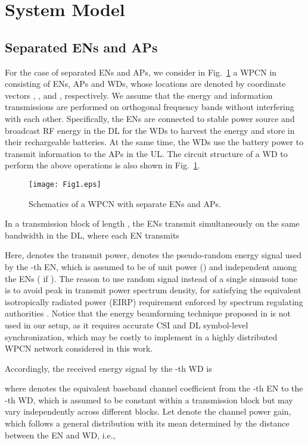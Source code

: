 \documentclass[journal, draftcls, one column, 12pt]{IEEEtran}
\begin{document}
\section{System Model}

\subsection{Separated ENs and APs}
For the case of separated ENs and APs, we consider in Fig.~\ref{61} a WPCN in  consisting of  ENs,  APs and  WDs, whose locations are denoted by  coordinate vectors , , and , respectively. We assume that the energy and information transmissions are performed on orthogonal frequency bands without interfering with each other. Specifically, the ENs are connected to stable power source and broadcast RF energy in the DL for the WDs to harvest the energy and store in their rechargeable batteries. At the same time, the WDs use the battery power to transmit information to the APs in the UL. The circuit structure of a WD to perform the above operations is also shown in Fig.~\ref{61}.

\begin{figure}
\centering
  \begin{center}
    \texttt{[image: Fig1.eps]}
  \end{center}
  \caption{Schematics of a WPCN with separate ENs and APs.}
  \label{61}
\end{figure}

In a transmission block of length , the  ENs transmit simultaneously on the same bandwidth in the DL, where each EN  transmits

Here,  denotes the transmit power,  denotes the pseudo-random energy signal used by the -th EN, which is assumed to be of unit power () and independent among the ENs ( if ). The reason to use random signal instead of a single sinusoid tone is to avoid peak in transmit power spectrum density, for satisfying the equivalent isotropically radiated power (EIRP) requirement enforced by spectrum regulating authorities \cite{2014:Bi}. Notice that the energy beamforming technique proposed in \cite{2013:Zhang} is not used in our setup, as it requires accurate CSI and DL symbol-level synchronization, which may be costly to implement in a highly distributed WPCN network considered in this work.

Accordingly, the received energy signal by the -th WD is

where  denotes the equivalent baseband channel coefficient from the -th EN to the -th WD, which is assumed to be constant within a transmission block but may vary independently across different blocks. Let  denote the channel power gain, which follows a general distribution with its mean determined by the distance between the EN and WD, i.e.,
\end{document}

